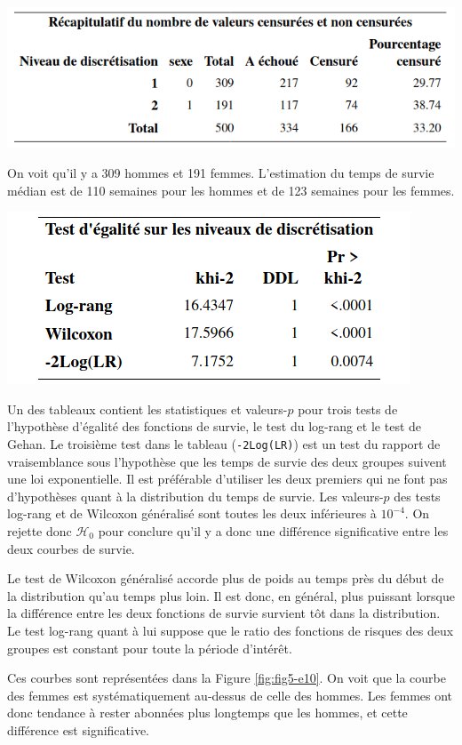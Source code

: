\documentclass[
  11pt,
  letterpaper,
]{book}
\theoremstyle{definition}
\theoremstyle{definition}
\theoremstyle{definition}
\theoremstyle{definition}
\theoremstyle{remark}
\begin{document}
\begin{center}\includegraphics[width=0.75\linewidth]{figures/05-survie-e8} \end{center}

On voit qu'il y a 309 hommes et 191 femmes. L'estimation du temps de survie médian est de 110 semaines pour les hommes et de 123 semaines pour les femmes.

\begin{center}\includegraphics[width=0.55\linewidth]{figures/05-survie-e9} \end{center}

Un des tableaux contient les statistiques et valeurs-\(p\) pour trois tests de l'hypothèse d'égalité des fonctions de survie, le test du log-rang et le test de Gehan. Le troisième test dans le tableau (\texttt{-2Log(LR)}) est un test du rapport de vraisemblance sous l'hypothèse que les temps de survie des deux groupes suivent une loi exponentielle. Il est préférable d'utiliser les deux premiers qui ne font pas d'hypothèses quant à la distribution du temps de survie. Les valeurs-\(p\) des tests log-rang et de Wilcoxon généralisé sont toutes les deux inférieures à \(10^{-4}\). On rejette donc \(\mathcal{H}_0\) pour conclure qu'il y a donc une différence significative entre les deux courbes de survie.

Le test de Wilcoxon généralisé accorde plus de poids au temps près du début de la distribution qu'au temps plus loin. Il est donc, en général, plus puissant lorsque la différence entre les deux fonctions de survie survient tôt dans la distribution. Le test log-rang quant à lui suppose que le ratio des fonctions de risques des deux groupes est constant pour toute la période d'intérêt.

Ces courbes sont représentées dans la Figure \ref{fig:fig5-e10}. On voit que la courbe des femmes est systématiquement au-dessus de celle des hommes. Les femmes ont donc tendance à rester abonnées plus longtemps que les hommes, et cette différence est significative.
\end{document}
